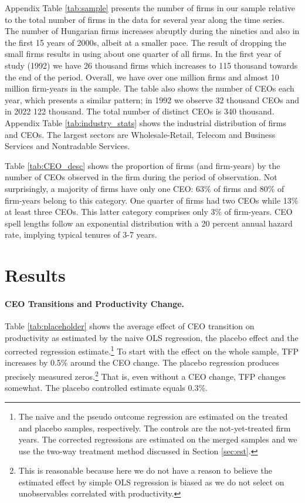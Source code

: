 \documentclass[11pt,a4paper]{article}
\begin{document}
Appendix Table \ref{tab:sample} presents the number of firms in our sample relative to the total number of firms in the data for several year along the time series. The number of Hungarian firms increases abruptly during the nineties and also in the first 15 years of 2000s, albeit at a smaller pace.  The result of dropping the small firms results in using about one quarter of all firms. In the first year of study (1992) we have 26 thousand firms which increases to 115 thousand towards the end of the period. Overall, we have over one million firms and almost 10 million firm-years in the sample. The table also shows the number of CEOs each year, which presents a similar pattern; in 1992 we observe 32 thousand CEOs and in 2022 122 thousand. The total number of distinct CEOs is 340 thousand. Appendix Table \ref{tab:industry_stats} shows the industrial distribution of firms and CEOs. The largest sectors are Wholesale-Retail, Telecom and Business Services and Nontradable Services. 

Table \ref{tab:CEO_desc} shows the proportion of firms (and firm-years) by the number of CEOs observed in the firm during the period of observation. Not surprisingly, a majority of firms have only one CEO: 63\% of firms and 80\% of firm-years belong to this category. One quarter of firms had two CEOs while 13\% at least three CEOs. This latter category comprises only 3\% of firm-years. CEO spell lengths follow an exponential distribution with a 20 percent annual hazard rate, implying typical tenures of 3-7 years.


\section{Results}

 

\paragraph{CEO Transitions and Productivity Change.} Table \ref{tab:placeholder} shows the average effect of CEO transition on productivity as estimated by the naive OLS regression, the placebo effect and the corrected regression estimate.\footnote{The naive and the pseudo outcome regression are estimated on the treated and placebo samples, respectively. The controls are the not-yet-treated firm years. The corrected regressions are estimated on the merged samples and we use the two-way treatment method discussed in Section \ref{sec:est}.} To start with the effect on the whole sample, TFP increases by 0.5\% around the CEO change. The placebo regression produces precisely measured zeros.\footnote{This is reasonable because here we do not have a reason to believe the estimated effect by simple OLS regression is biased as we do not select on unobservables correlated with productivity.} That is, even without a CEO change, TFP changes somewhat. The placebo controlled estimate equals 0.3\%. 
\end{document}
